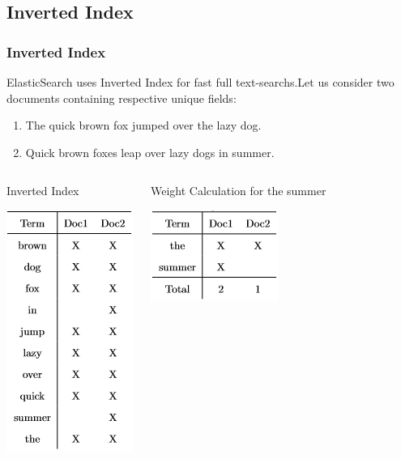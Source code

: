 \documentclass[xcolor=dvipsnames]{beamer}
\begin{document}
\subsection{Inverted Index}
\begin{frame}[fragile]
\frametitle{Inverted Index}
ElasticSearch uses Inverted Index for fast full text-searchs.Let us consider two documents containing respective unique fields:
\begin{enumerate}
\item The quick brown fox jumped over the lazy dog.
\item Quick brown foxes leap over lazy dogs in summer. 
\end{enumerate}
\begin{columns}[c]
\begin{exampleblock}{\small{Inverted Index}}
\begin{center}
\includegraphics[scale=0.5]{t1.png}
\end{center}
\end{exampleblock}

\begin{exampleblock}{\small{Weight Calculation for the summer}}
\begin{center}
\includegraphics[scale=0.5]{t2.png}
\end{center}
\end{exampleblock}
\end{columns}
\end{frame}
\end{document}
